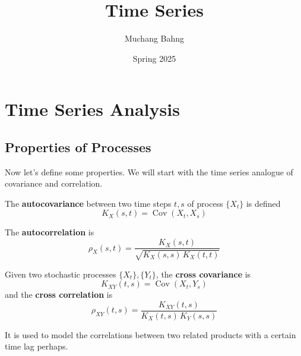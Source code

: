 \documentclass{article}
\DeclareMathOperator{\Cov}{Cov}
\begin{document}
\title{Time Series}
\author{Muchang Bahng}
\date{Spring 2025}

\maketitle
\tableofcontents
\pagebreak



\section{Time Series Analysis}

\subsection{Properties of Processes}

  Now let's define some properties. We will start with the time series analogue of covariance and correlation. 

  \begin{definition}[Autocovariance]
    The \textbf{autocovariance} between two time steps $t, s$ of process $\{X_t\}$ is defined 
    \begin{equation}
      K_X (s, t) = \Cov(X_t, X_s)
    \end{equation}
  \end{definition}

  \begin{definition}[Autocorrelation]
    The \textbf{autocorrelation} is 
    \begin{equation}
      \rho_X (s, t) = \frac{K_X (s, t)}{\sqrt{K_X (s, s) \, K_X (t, t)}}
    \end{equation}
  \end{definition}

  \begin{definition}
    Given two stochastic processes $\{X_t\}, \{Y_t\}$, the \textbf{cross covariance} is 
    \begin{equation}
      K_{XY} (t, s) = \Cov(X_t, Y_s)
    \end{equation}
    and the \textbf{cross correlation} is 
    \begin{equation}
      \rho_{XY} (t, s) = \frac{K_{XY}(t, s)}{K_X (t, s) \, K_Y(s, s)}
    \end{equation}

    It is used to model the correlations between two related products with a certain time lag perhaps.  
  \end{definition}
\end{document}
